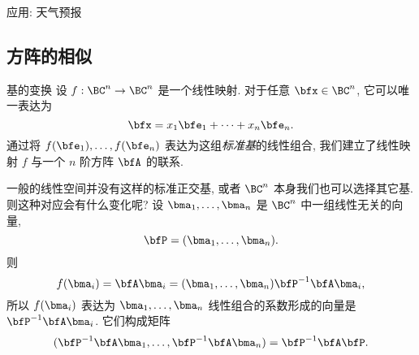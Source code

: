 	
\begin{frame}{应用: 天气预报}
	\onslide<+->
	\begin{solution}[续解]
	\end{solution}
\end{frame}






\subsection{方阵的相似}

\begin{frame}{基的变换}
	\onslide<+->
	设 $f:\BC^n\to \BC^n$ 是一个线性映射.
	\onslide<+->
	对于任意 $\bfx\in \BC^n$, 它可以唯一表达为
	\[\bfx=x_1\bfe_1+\cdots+x_n\bfe_n.\]
	\onslide<+->
	通过将 $f(\bfe_1),\dots,f(\bfe_n)$ 表达为这组\emph{标准基}的线性组合, 我们建立了线性映射 $f$ 与一个 $n$ 阶方阵 $\bfA$ 的联系.

	\onslide<+->
	一般的线性空间并没有这样的标准正交基, 或者 $\BC^n$ 本身我们也可以选择其它基.
	\onslide<+->
	则这种对应会有什么变化呢?
	\onslide<+->
	设 $\bma_1,\dots,\bma_n$ 是 $\BC^n$ 中一组线性无关的向量, 
	\[\bfP=(\bma_1,\dots,\bma_n).\]
	\onslide<+->
	则
	\[f(\bma_i)=\bfA\bma_i=(\bma_1,\dots,\bma_n)\bfP^{-1}\bfA\bma_i,\]
	所以 $f(\bma_i)$ 表达为 $\bma_1,\dots,\bma_n$ 线性组合的系数形成的向量是 $\bfP^{-1}\bfA\bma_i$.
	\onslide<+->
	它们构成矩阵
	\[(\bfP^{-1}\bfA\bma_1,\dots,\bfP^{-1}\bfA\bma_n)=\bfP^{-1}\bfA\bfP.\]
\end{frame}


